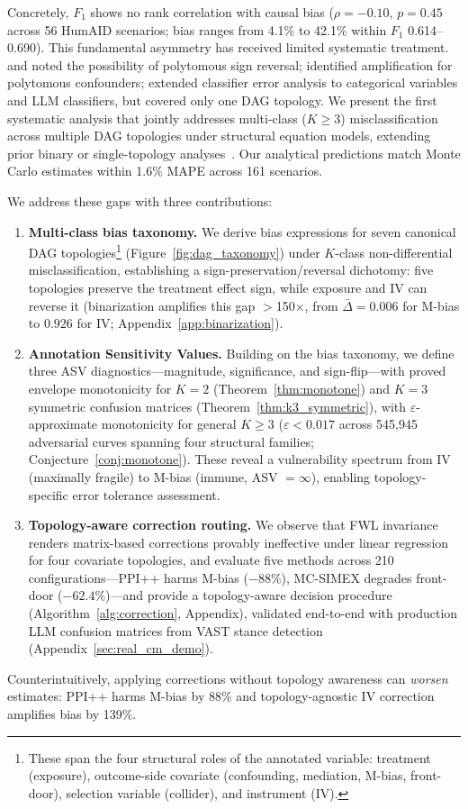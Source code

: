 Concretely, $F_1$ shows no rank correlation with causal bias ($\rho = -0.10$, $p = 0.45$ across 56 HumAID scenarios; bias ranges from 4.1\% to 42.1\% within $F_1$ 0.614--0.690). This fundamental asymmetry has received limited systematic treatment. \citet{dosemeci1990} and \citet{veirod_laake2001} noted the possibility of polytomous sign reversal; \citet{brenner1993} identified amplification for polytomous confounders; \citet{lee_wood_doughty2024} extended classifier error analysis to categorical variables and LLM classifiers, but covered only one DAG topology. We present the first systematic analysis that jointly addresses multi-class ($K{\geq}3$) misclassification across multiple DAG topologies under structural equation models, extending prior binary or single-topology analyses~\cite{brenner1993, teblunthuis2024}. Our analytical predictions match Monte Carlo estimates within 1.6\% MAPE across 161 scenarios.

We address these gaps with three contributions:

\begin{enumerate}
\item \textbf{Multi-class bias taxonomy.} We derive bias expressions for seven canonical DAG topologies\footnote{These span the four structural roles of the annotated variable: treatment (exposure), outcome-side covariate (confounding, mediation, M-bias, front-door), selection variable (collider), and instrument (IV).} (Figure~\ref{fig:dag_taxonomy}) under $K$-class non-differential misclassification, establishing a sign-preservation/reversal dichotomy: five topologies preserve the treatment effect sign, while exposure and IV can reverse it (binarization amplifies this gap $>$150${\times}$, from $\bar{\Delta}{=}0.006$ for M-bias to $0.926$ for IV; Appendix~\ref{app:binarization}).

\item \textbf{Annotation Sensitivity Values.} Building on the bias taxonomy, we define three ASV diagnostics---magnitude, significance, and sign-flip---with proved envelope monotonicity for $K{=}2$ (Theorem~\ref{thm:monotone}) and $K{=}3$ symmetric confusion matrices (Theorem~\ref{thm:k3_symmetric}), with $\varepsilon$-approximate monotonicity for general $K{\geq}3$ ($\varepsilon < 0.017$ across 545{,}945 adversarial curves spanning four structural families; Conjecture~\ref{conj:monotone}). These reveal a vulnerability spectrum from IV (maximally fragile) to M-bias (immune, ASV $= \infty$), enabling topology-specific error tolerance assessment.

\item \textbf{Topology-aware correction routing.} We observe that FWL invariance renders matrix-based corrections provably ineffective under linear regression for four covariate topologies, and evaluate five methods across 210 configurations---PPI++ harms M-bias ($-88\%$), MC-SIMEX degrades front-door ($-62.4\%$)---and provide a topology-aware decision procedure (Algorithm~\ref{alg:correction}, Appendix), validated end-to-end with production LLM confusion matrices from VAST stance detection (Appendix~\ref{sec:real_cm_demo}).
\end{enumerate}

Counterintuitively, applying corrections without topology awareness can \emph{worsen} estimates: PPI++ harms M-bias by 88\% and topology-agnostic IV correction amplifies bias by 139\%.
